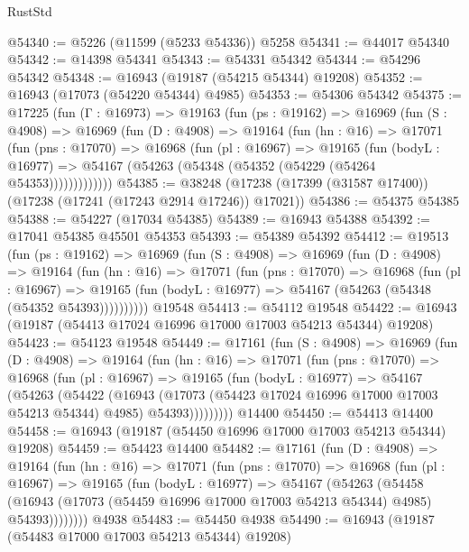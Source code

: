 \begin{lexlean}{RustStd}
\begin{coremodule}
@54340 := @5226 (@11599 (@5233 @54336)) @5258
@54341 := @44017 @54340
@54342 := @14398 @54341
@54343 := @54331 @54342
@54344 := @54296 @54342
@54348 := @16943 (@19187 (@54215 @54344) @19208)
@54352 := @16943 (@17073 (@54220 @54344) @4985)
@54353 := @54306 @54342
@54375 := @17225
    (fun (Γ : @16973) =>
    @19163
      (fun (ps : @19162) =>
      @16969
        (fun (S : @4908) =>
        @16969
          (fun (D : @4908) =>
          @19164
            (fun (hn : @16) =>
            @17071
              (fun (pns : @17070) =>
              @16968
                (fun (pl : @16967) =>
                @19165
                  (fun (bodyL : @16977) =>
                  @54167 (@54263 (@54348 (@54352 (@54229 (@54264 @54353)))))))))))))
@54385 := @38248 (@17238 (@17399 (@31587 @17400)) (@17238 (@17241 (@17243 @2914 @17246)) @17021))
@54386 := @54375 @54385
@54388 := @54227 (@17034 @54385)
@54389 := @16943 @54388
@54392 := @17041 @54385 @45501 @54353
@54393 := @54389 @54392
@54412 := @19513
    (fun (ps : @19162) =>
    @16969
      (fun (S : @4908) =>
      @16969
        (fun (D : @4908) =>
        @19164
          (fun (hn : @16) =>
          @17071
            (fun (pns : @17070) =>
            @16968
              (fun (pl : @16967) =>
              @19165 (fun (bodyL : @16977) => @54167 (@54263 (@54348 (@54352 @54393))))))))))
    @19548
@54413 := @54112 @19548
@54422 := @16943 (@19187 (@54413 @17024 @16996 @17000 @17003 @54213 @54344) @19208)
@54423 := @54123 @19548
@54449 := @17161
    (fun (S : @4908) =>
    @16969
      (fun (D : @4908) =>
      @19164
        (fun (hn : @16) =>
        @17071
          (fun (pns : @17070) =>
          @16968
            (fun (pl : @16967) =>
            @19165
              (fun (bodyL : @16977) =>
              @54167
                (@54263
                  (@54422
                    (@16943
                      (@17073 (@54423 @17024 @16996 @17000 @17003 @54213 @54344) @4985)
                      @54393)))))))))
    @14400
@54450 := @54413 @14400
@54458 := @16943 (@19187 (@54450 @16996 @17000 @17003 @54213 @54344) @19208)
@54459 := @54423 @14400
@54482 := @17161
    (fun (D : @4908) =>
    @19164
      (fun (hn : @16) =>
      @17071
        (fun (pns : @17070) =>
        @16968
          (fun (pl : @16967) =>
          @19165
            (fun (bodyL : @16977) =>
            @54167
              (@54263
                (@54458
                  (@16943 (@17073 (@54459 @16996 @17000 @17003 @54213 @54344) @4985) @54393))))))))
    @4938
@54483 := @54450 @4938
@54490 := @16943 (@19187 (@54483 @17000 @17003 @54213 @54344) @19208)

\end{coremodule}
\end{lexlean}
